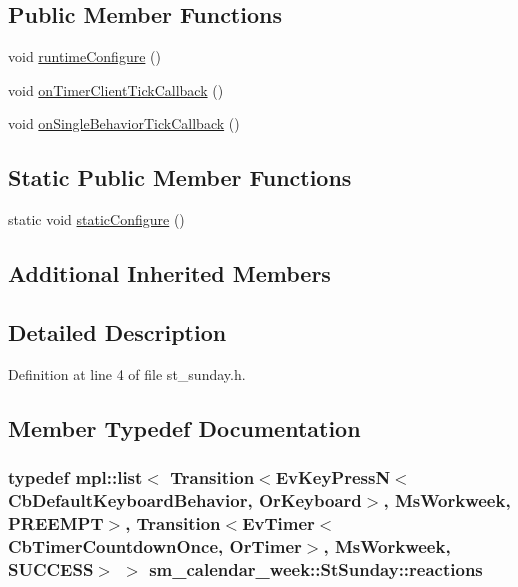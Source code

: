 \subsection*{Public Member Functions}
\begin{DoxyCompactItemize}
\item 
void \hyperlink{structsm__calendar__week_1_1StSunday_a28c840bf204044472162a7d3f14da28b}{runtime\+Configure} ()
\item 
void \hyperlink{structsm__calendar__week_1_1StSunday_a6bba2c59172fea49fc346a658b592557}{on\+Timer\+Client\+Tick\+Callback} ()
\item 
void \hyperlink{structsm__calendar__week_1_1StSunday_a5fd7a600527ff7246a90fffede448544}{on\+Single\+Behavior\+Tick\+Callback} ()
\end{DoxyCompactItemize}
\subsection*{Static Public Member Functions}
\begin{DoxyCompactItemize}
\item 
static void \hyperlink{structsm__calendar__week_1_1StSunday_ac9d8f202395f72b238783630e8c1d2f2}{static\+Configure} ()
\end{DoxyCompactItemize}
\subsection*{Additional Inherited Members}


\subsection{Detailed Description}


Definition at line 4 of file st\+\_\+sunday.\+h.



\subsection{Member Typedef Documentation}
\subsubsection[{\texorpdfstring{reactions}{reactions}}]{\setlength{\rightskip}{0pt plus 5cm}typedef mpl\+::list$<$ Transition$<$Ev\+Key\+PressN$<$Cb\+Default\+Keyboard\+Behavior, {\bf Or\+Keyboard}$>$, {\bf Ms\+Workweek}, {\bf P\+R\+E\+E\+M\+PT}$>$, Transition$<$Ev\+Timer$<$Cb\+Timer\+Countdown\+Once, {\bf Or\+Timer}$>$, {\bf Ms\+Workweek}, {\bf S\+U\+C\+C\+E\+SS}$>$ $>$ {\bf sm\+\_\+calendar\+\_\+week\+::\+St\+Sunday\+::reactions}}\hypertarget{structsm__calendar__week_1_1StSunday_af2828352a507a4c972e43b318bb59a51}{}\label{structsm__calendar__week_1_1StSunday_af2828352a507a4c972e43b318bb59a51}


